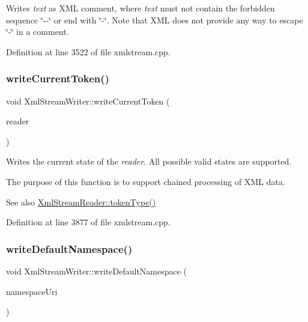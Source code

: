 Writes {\itshape text} as X\+ML comment, where {\itshape text} must not contain the forbidden sequence \char`\"{}-\/-\/\char`\"{} or end with \char`\"{}-\/\char`\"{}. Note that X\+ML does not provide any way to escape \char`\"{}-\/\char`\"{} in a comment. 

Definition at line 3522 of file xmlstream.\+cpp.

\mbox{\label{class_xml_stream_writer_ad3fc36a8359435e85bb0fa85dc785d70}} 
\subsubsection{\texorpdfstring{write\+Current\+Token()}{writeCurrentToken()}}
{\footnotesize\ttfamily void Xml\+Stream\+Writer\+::write\+Current\+Token (\begin{DoxyParamCaption}\item[{const \hyperlink{class_xml_stream_reader}{Xml\+Stream\+Reader} \&}]{reader }\end{DoxyParamCaption})}

Writes the current state of the {\itshape reader}. All possible valid states are supported.

The purpose of this function is to support chained processing of X\+ML data.

\begin{DoxySeeAlso}{See also}
\hyperlink{class_xml_stream_reader_a2c26bfb63c27f2992e24f038d65c8c0a}{Xml\+Stream\+Reader\+::token\+Type()} 
\end{DoxySeeAlso}


Definition at line 3877 of file xmlstream.\+cpp.

\mbox{\label{class_xml_stream_writer_ad545600b4e2c9d73ad9e216a20ff081e}} 
\subsubsection{\texorpdfstring{write\+Default\+Namespace()}{writeDefaultNamespace()}}
{\footnotesize\ttfamily void Xml\+Stream\+Writer\+::write\+Default\+Namespace (\begin{DoxyParamCaption}\item[{const Q\+String \&}]{namespace\+Uri }\end{DoxyParamCaption})}

